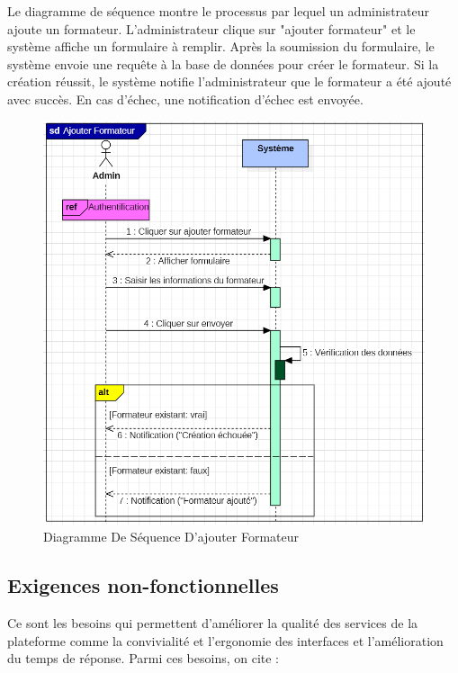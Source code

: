 Le diagramme de séquence montre le processus par lequel un administrateur ajoute un formateur. L'administrateur clique sur "ajouter formateur" et le système affiche un formulaire à remplir. Après la soumission du formulaire, le système envoie une requête à la base de données pour créer le formateur. Si la création réussit, le système notifie l'administrateur que le formateur a été ajouté avec succès. En cas d'échec, une notification d'échec est envoyée.

\begin{figure}[H]
    \centering
    \includegraphics[width=17cm]{Figures/diagrammeDeSequenceAddAuthor.PNG}
    \caption{Diagramme De Séquence D'ajouter Formateur}
\end{figure}


\subsection{Exigences non-fonctionnelles}


Ce sont les besoins qui permettent d’améliorer la qualité des services de la plateforme comme la convivialité et l’ergonomie des interfaces et l’amélioration du temps de réponse. Parmi ces besoins, on cite :


